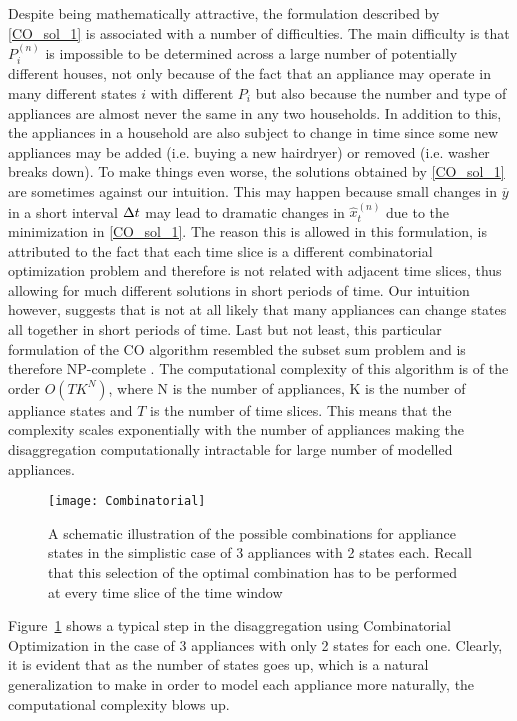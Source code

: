 \documentclass[10pt]{article}
\begin{document}
Despite being mathematically attractive, the formulation described by \eqref{CO_sol_1} is associated with a number of difficulties. The main difficulty is that $P_{i}^{(n)}$ is impossible to be determined across a large number of potentially different houses, not only because of the fact that an appliance may operate in many different states $i$ with different $P_i$ but also because the number and type of appliances are almost never the same in any two households. In addition to this, the appliances in a household are also subject to change in time since some new appliances may be added (i.e. buying a new hairdryer) or removed (i.e. washer breaks down). To make things even worse, the solutions obtained by \eqref{CO_sol_1} are sometimes against our intuition. This may happen because small changes in $\overline{y}$ in a short interval $\Delta t$ may lead to dramatic changes in $\hat{x}^{(n)}_t$ due to the minimization in \eqref{CO_sol_1}. The reason this is allowed in this formulation, is attributed to the fact that each time slice is a different combinatorial optimization problem and therefore is not related with adjacent time slices, thus allowing for much different solutions in short periods of time. Our intuition however, suggests that is not at all likely that many appliances can change states all together in short periods of time. Last but not least, this particular formulation of the CO algorithm resembled the subset sum problem and is therefore NP-complete \cite{NILMTK,Hart}. The computational complexity of this algorithm is of the order $O(TK^N)$, where N is the number of appliances, K is the number of appliance states and $T$ is the number of time slices. This means that the complexity scales exponentially with the number of appliances making the disaggregation computationally intractable for large number of modelled appliances.

\begin{figure}[!ht]
  \centering
  \texttt{[image: Combinatorial]}
  \caption{A schematic illustration of the possible combinations for appliance states in the simplistic case of 3 appliances with 2 states each. Recall that this selection of the optimal combination has to be performed at every time slice of the time window}\label{fig:comb}
\end{figure}

%

Figure~\ref{fig:comb} shows a typical step in the disaggregation using Combinatorial Optimization in the case of 3 appliances with only 2 states for each one. Clearly, it is evident that as the number of states goes up, which is a natural generalization to make in order to model each appliance more naturally, the computational complexity blows up.
\end{document}

